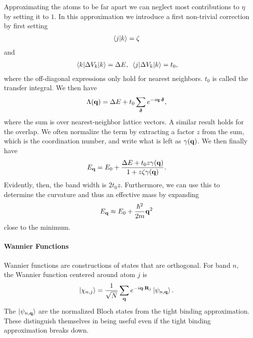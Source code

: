 Approximating the atoms to be far apart we can neglect most contributions to $\eta$ by setting it to $1$. In this approximation we introduce a first non-trivial correction by first setting
\begin{align*}
	\braket{j}{k} = \zeta
\end{align*}
and
\begin{align*}
	\expval{\Delta V_{k}}{k} = \Delta E,\ \mel{j}{\Delta V_{k}}{k} = t_{0},
\end{align*}
where the off-diagonal expressions only hold for nearest neighbors. $t_{0}$ is called the transfer integral. We then have
\begin{align*}
	\Lambda(\vb{q}) = \Delta E + t_{0}\sum\limits_{\vb*{\delta}}e^{-i\vb{q}\cdot\vb*{\delta}},
\end{align*}
where the sum is over nearest-neighbor lattice vectors. A similar result holds for the overlap. We often normalize the term by extracting a factor $z$ from the sum, which is the coordination number, and write what is left as $\gamma(\vb{q})$. We then finally have
\begin{align*}
	E_{\vb{q}} = E_{0} + \frac{\Delta E + t_{0}z\gamma(\vb{q})}{1 + z\zeta\gamma(\vb{q})}.
\end{align*}
Evidently, then, the band width is $2t_{0}z$. Furthermore, we can use this to determine the curvature and thus an effective mass by expanding
\begin{align*}
	E_{\vb{q}} \approx E_{0} + \frac{\hbar^{2}}{2m}\vb{q}^{2}
\end{align*}
close to the minimum.

\paragraph{Wannier Functions}
Wannier functions are constructions of states that are orthogonal. For band $n$, the Wannier function centered around atom $j$ is
\begin{align*}
	\ket{\chi_{n, j}} = \frac{1}{\sqrt{N}}\sum\limits_{\vb{q}}e^{-i\vb{q}\cdot\vb{R}_{j}}\ket{\psi_{n, \vb{q}}}.
\end{align*}
The $\ket{\psi_{n, \vb{q}}}$ are the normalized Bloch states from the tight binding approximation. These distinguish themselves in being useful even if the tight binding approximation breaks down.

